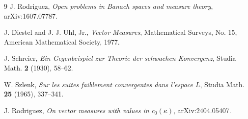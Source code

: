 \documentclass[11pt]{article}
\begin{document}
\begin{thebibliography}{9}
J. Rodriguez,
\emph{Open problems in Banach spaces and measure theory},
arXiv:1607.07787.

J. Diestel and J. J. Uhl, Jr.,
\emph{Vector Measures},
Mathematical Surveys, No. 15, American Mathematical Society, 1977.

J. Schreier,
\emph{Ein Gegenbeispiel zur Theorie der schwachen Konvergenz},
Studia Math. \textbf{2} (1930), 58--62.

W. Szlenk,
\emph{Sur les suites faiblement convergentes dans l'espace \(L\)},
Studia Math. \textbf{25} (1965), 337--341.

J. Rodriguez,
\emph{On vector measures with values in \(c_0(\kappa)\)},
arXiv:2404.05407.
\end{thebibliography}
\end{document}
